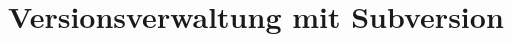 \section{Versionsverwaltung mit Subversion} \label{sec:impl-Versionsverwaltung}



		







\label{sec:impl-Versionsverwaltung-ende}